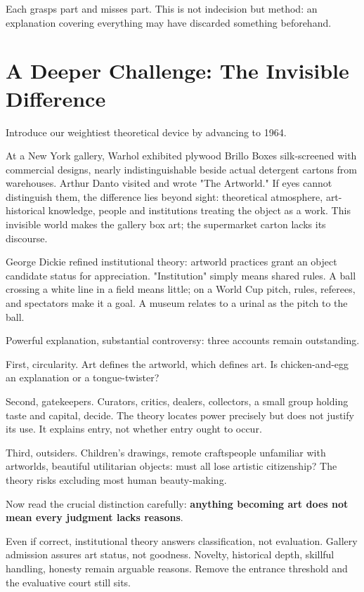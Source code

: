 Each grasps part and misses part. This is not indecision but method: an explanation covering everything may have discarded something beforehand.

\section{A Deeper Challenge: The Invisible Difference}
Introduce our weightiest theoretical device by advancing to 1964.

At a New York gallery, Warhol exhibited plywood Brillo Boxes silk-screened with commercial designs, nearly indistinguishable beside actual detergent cartons from warehouses. Arthur Danto visited and wrote "The Artworld." If eyes cannot distinguish them, the difference lies beyond sight: theoretical atmosphere, art-historical knowledge, people and institutions treating the object as a work. This invisible world makes the gallery box art; the supermarket carton lacks its discourse.

George Dickie refined institutional theory: artworld practices grant an object candidate status for appreciation. "Institution" simply means shared rules. A ball crossing a white line in a field means little; on a World Cup pitch, rules, referees, and spectators make it a goal. A museum relates to a urinal as the pitch to the ball.

Powerful explanation, substantial controversy: three accounts remain outstanding.

First, circularity. Art defines the artworld, which defines art. Is chicken-and-egg an explanation or a tongue-twister?

Second, gatekeepers. Curators, critics, dealers, collectors, a small group holding taste and capital, decide. The theory locates power precisely but does not justify its use. It explains entry, not whether entry ought to occur.

Third, outsiders. Children's drawings, remote craftspeople unfamiliar with artworlds, beautiful utilitarian objects: must all lose artistic citizenship? The theory risks excluding most human beauty-making.

Now read the crucial distinction carefully: \textbf{anything becoming art does not mean every judgment lacks reasons}.

Even if correct, institutional theory answers classification, not evaluation. Gallery admission assures art status, not goodness. Novelty, historical depth, skillful handling, honesty remain arguable reasons. Remove the entrance threshold and the evaluative court still sits.

